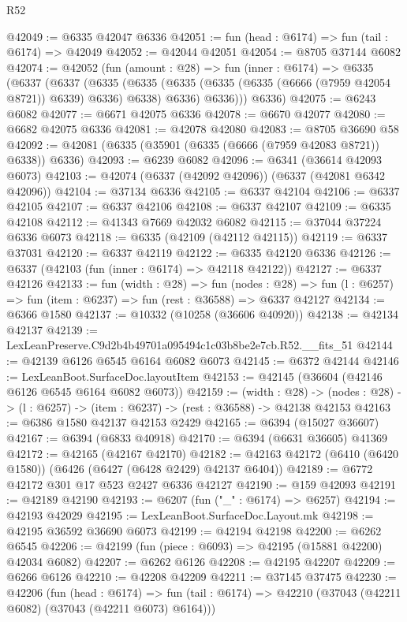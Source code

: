 \begin{lexlean}{R52}
\begin{coremodule}
@42049 := @6335 @42047 @6336
@42051 := fun (head : @6174) => fun (tail : @6174) => @42049
@42052 := @42044 @42051
@42054 := @8705 @37144 @6082
@42074 := @42052
    (fun (amount : @28) =>
    fun (inner : @6174) =>
    @6335
      (@6337
        (@6337
          (@6335
            (@6335 (@6335 (@6335 (@6335 (@6666 (@7959 @42054 @8721)) @6339) @6336) @6338) @6336)
            @6336)))
      @6336)
@42075 := @6243 @6082
@42077 := @6671 @42075 @6336
@42078 := @6670 @42077
@42080 := @6682 @42075 @6336
@42081 := @42078 @42080
@42083 := @8705 @36690 @58
@42092 := @42081 (@6335 (@35901 (@6335 (@6666 (@7959 @42083 @8721)) @6338)) @6336)
@42093 := @6239 @6082
@42096 := @6341 (@36614 @42093 @6073)
@42103 := @42074 (@6337 (@42092 @42096)) (@6337 (@42081 @6342 @42096))
@42104 := @37134 @6336
@42105 := @6337 @42104
@42106 := @6337 @42105
@42107 := @6337 @42106
@42108 := @6337 @42107
@42109 := @6335 @42108
@42112 := @41343 @7669 @42032 @6082
@42115 := @37044 @37224 @6336 @6073
@42118 := @6335 (@42109 (@42112 @42115))
@42119 := @6337 @37031
@42120 := @6337 @42119
@42122 := @6335 @42120 @6336
@42126 := @6337 (@42103 (fun (inner : @6174) => @42118 @42122))
@42127 := @6337 @42126
@42133 := fun (width : @28) =>
  fun (nodes : @28) => fun (l : @6257) => fun (item : @6237) => fun (rest : @36588) => @6337 @42127
@42134 := @6366 @1580
@42137 := @10332 (@10258 (@36606 @40920))
@42138 := @42134 @42137
@42139 := LexLeanPreserve.C9d2b4b49701a095494c1c03b8be2e7cb.R52.__fits_51
@42144 := @42139 @6126 @6545 @6164 @6082 @6073
@42145 := @6372 @42144
@42146 := LexLeanBoot.SurfaceDoc.layoutItem
@42153 := @42145 (@36604 (@42146 @6126 @6545 @6164 @6082 @6073))
@42159 := (width : @28) ->
  (nodes : @28) -> (l : @6257) -> (item : @6237) -> (rest : @36588) -> @42138 @42153
@42163 := @6386 @1580 @42137 @42153 @2429
@42165 := @6394 (@15027 @36607)
@42167 := @6394 (@6833 @40918)
@42170 := @6394 (@6631 @36605) @41369
@42172 := @42165 (@42167 @42170)
@42182 := @42163 @42172 (@6410 (@6420 @1580)) (@6426 (@6427 (@6428 @2429) @42137 @6404))
@42189 := @6772 @42172 @301 @17 @523 @2427 @6336 @42127
@42190 := @159 @42093
@42191 := @42189 @42190
@42193 := @6207 (fun ("_" : @6174) => @6257)
@42194 := @42193 @42029
@42195 := LexLeanBoot.SurfaceDoc.Layout.mk
@42198 := @42195 @36592 @36690 @6073
@42199 := @42194 @42198
@42200 := @6262 @6545
@42206 := @42199 (fun (piece : @6093) => @42195 (@15881 @42200) @42034 @6082)
@42207 := @6262 @6126
@42208 := @42195 @42207
@42209 := @6266 @6126
@42210 := @42208 @42209
@42211 := @37145 @37475
@42230 := @42206
    (fun (head : @6174) =>
    fun (tail : @6174) => @42210 (@37043 (@42211 @6082) (@37043 (@42211 @6073) @6164)))

\end{coremodule}
\end{lexlean}
